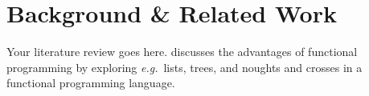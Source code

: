 \chapter{Background \& Related Work}
\label{ch:background}

Your literature review goes here. \citet{hughes1989functional} discusses the advantages of functional programming by exploring \emph{e.g.}\ lists, trees, and noughts and crosses in a functional programming language.
